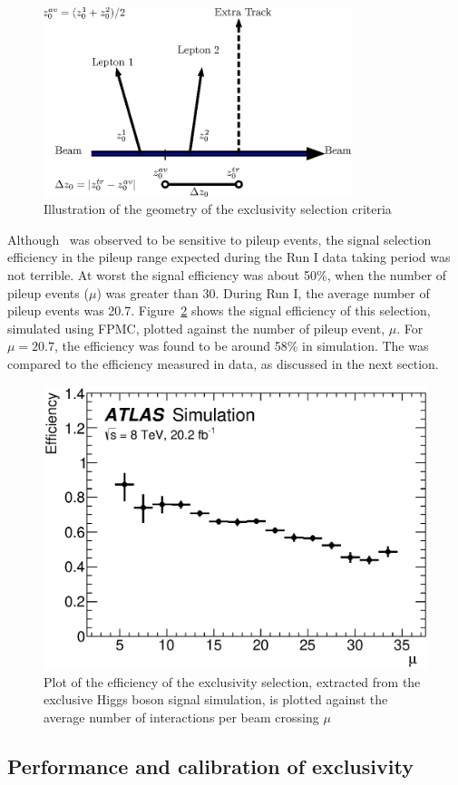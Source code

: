 \begin{figure}[!h]
\centering
   \includegraphics[width=0.8\textwidth]{figures/cartoon.eps}
\caption{Illustration of the geometry of the exclusivity selection criteria}
\label{fig:exclCartoon}
\end{figure}

\par Although \DZ\ was observed to be sensitive to pileup events, the signal selection 
efficiency in the pileup range expected during the Run I data taking period was not terrible. At 
worst the signal efficiency was about 50\%, when the number of pileup events ($\mu$) was 
greater than 30. During Run I, the average number of pileup events was 20.7. Figure~\ref{fig:pileupEff} 
shows the signal efficiency of this selection, simulated using FPMC, plotted against 
the number of pileup event, $\mu$. For $\mu=20.7$, the efficiency was found to be around 58\% 
in simulation. The was compared to the efficiency measured in data, as discussed in the 
next section. 

\begin{figure}[!h]
\centering
 \includegraphics[width=0.8\linewidth]{figures/muFit.eps} 
\caption{Plot of the efficiency of the exclusivity selection, extracted from the
exclusive Higgs boson signal simulation, is plotted 
against the average number of interactions per beam crossing
$\mu$}
\label{fig:pileupEff}
\end{figure}

\subsection{Performance and calibration of exclusivity}
\label{sec:exclCalib}

